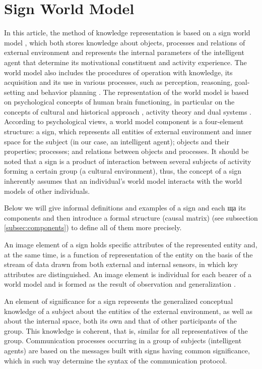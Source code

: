 \documentclass[review]{elsarticle}
\begin{document}
\section{Sign World Model}\label{sec:swm}

In this article, the method of knowledge representation is based on a sign world model  \cite{Osipov2014c,Osipov2015d, Osipov2015c}, which both stores knowledge about objects, processes and relations of external environment and represents the internal parameters of the intelligent agent that determine its motivational constituent and activity experience. The world model also includes the procedures of operation with knowledge, its acquisition and its use in various processes, such as perception, reasoning, goal-setting and behavior planning \cite{Osipov2015d}. The representation of the world model is based on psychological concepts of human brain functioning, in particular on the concepts of cultural and historical approach \cite{Vygotsky1986}, activity theory \cite{Leontyev2009,Verenikina,Igira2009} and dual systems \cite{Evans2013,Stanovich2009}. According to psychological views, a world model component is a four-element structure: a sign, which represents all entities of external environment and inner space for the subject (in our case, an intelligent agent); objects and their properties; processes; and relations between objects and processes. It should be noted that a sign is a product of interaction between several subjects of activity forming a certain group (a cultural environment), thus, the concept of a sign inherently assumes that an individual's world model interacts with the world models of other individuals.

Below we will give informal definitions and examples of a sign and each ща its components and then introduce a formal structure (causal matrix) (see subsection \ref{subsec:components}) to define all of them more precisely.

An image element of a sign holds specific attributes of the represented entity and, at the same time, is a function of representation of the entity on the basis of the stream of data drawn from both external and internal sensors, in which key attributes are distinguished. An image element is individual for each bearer of a world model and is formed as the result of observation and generalization \cite{Osipov2015d,Skrynnik2016}. 

An element of significance for a sign represents the generalized conceptual knowledge of a subject about the entities of the external environment, as well as about the internal space, both its own and that of other participants of the group. This knowledge is coherent, that is, similar for all representatives of the group. Communication processes occurring in a group of subjects (intelligent agents) are based on the messages built with signs having common significance, which in such way determine the syntax of the communication protocol.
\end{document}
